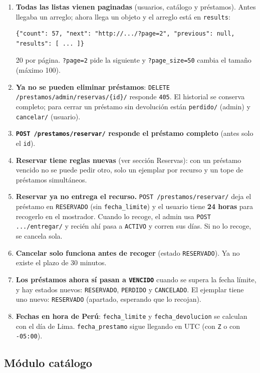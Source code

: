 \documentclass[11pt]{article}
\newcommand{\us}{\_\allowbreak}
\begin{document}
\begin{enumerate}
    \item \textbf{Todas las listas vienen paginadas} (usuarios, cat\'alogo y pr\'estamos). Antes llegaba un arreglo; ahora llega un objeto y el arreglo est\'a en \texttt{results}:
\begin{lstlisting}
{"count": 57, "next": "http://.../?page=2", "previous": null, "results": [ ... ]}
\end{lstlisting}
    20 por p\'agina. \texttt{?page=2} pide la siguiente y \texttt{?page\us size=50} cambia el tama\~no (m\'aximo 100).
    \item \textbf{Ya no se pueden eliminar pr\'estamos}: \texttt{DELETE /prestamos/admin/reservas/\{id\}/} responde \texttt{405}. El historial se conserva completo; para cerrar un pr\'estamo sin devoluci\'on est\'an \texttt{perdido/} (admin) y \texttt{cancelar/} (usuario).
    \item \textbf{\texttt{POST /prestamos/reservar/} responde el pr\'estamo completo} (antes solo el \texttt{id}).
    \item \textbf{Reservar tiene reglas nuevas} (ver secci\'on Reservas): con un pr\'estamo vencido no se puede pedir otro, solo un ejemplar por recurso y un tope de pr\'estamos simult\'aneos.
    \item \textbf{Reservar ya no entrega el recurso.} \texttt{POST /prestamos/reservar/} deja el pr\'estamo en \texttt{RESERVADO} (sin \texttt{fecha\us limite}) y el usuario tiene \textbf{24 horas} para recogerlo en el mostrador. Cuando lo recoge, el admin usa \texttt{POST .../entregar/} y reci\'en ah\'i pasa a \texttt{ACTIVO} y corren sus d\'ias. Si no lo recoge, se cancela sola.
    \item \textbf{Cancelar solo funciona antes de recoger} (estado \texttt{RESERVADO}). Ya no existe el plazo de 30 minutos.
    \item \textbf{Los pr\'estamos ahora s\'i pasan a \texttt{VENCIDO}} cuando se supera la fecha l\'imite, y hay estados nuevos: \texttt{RESERVADO}, \texttt{PERDIDO} y \texttt{CANCELADO}. El ejemplar tiene uno nuevo: \texttt{RESERVADO} (apartado, esperando que lo recojan).
    \item \textbf{Fechas en hora de Per\'u}: \texttt{fecha\us limite} y \texttt{fecha\us devolucion} se calculan con el d\'ia de Lima. \texttt{fecha\us prestamo} sigue llegando en UTC (con \texttt{Z} o con \texttt{-05:00}).
\end{enumerate}

\subsection*{M\'odulo cat\'alogo}
\end{document}
